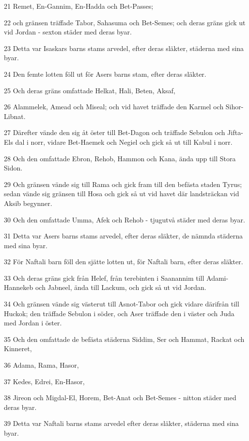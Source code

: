 \par 21 Remet, En-Gannim, En-Hadda och Bet-Passes;
\par 22 och gränsen träffade Tabor, Sahasuma och Bet-Semes; och deras gräns gick ut vid Jordan - sexton städer med deras byar.
\par 23 Detta var Isaskars barns stams arvedel, efter deras släkter, städerna med sina byar.
\par 24 Den femte lotten föll ut för Asers barns stam, efter deras släkter.
\par 25 Och deras gräns omfattade Helkat, Hali, Beten, Aksaf,
\par 26 Alammelek, Amead och Miseal; och vid havet träffade den Karmel och Sihor-Libnat.
\par 27 Därefter vände den sig åt öster till Bet-Dagon och träffade Sebulon och Jifta-Els dal i norr, vidare Bet-Haemek och Negiel och gick så ut till Kabul i norr.
\par 28 Och den omfattade Ebron, Rehob, Hammon och Kana, ända upp till Stora Sidon.
\par 29 Och gränsen vände sig till Rama och gick fram till den befästa staden Tyrus; sedan vände sig gränsen till Hosa och gick så ut vid havet där landsträckan vid Aksib begynner.
\par 30 Och den omfattade Umma, Afek och Rehob - tjugutvå städer med deras byar.
\par 31 Detta var Asers barns stams arvedel, efter deras släkter, de nämnda städerna med sina byar.
\par 32 För Naftali barn föll den sjätte lotten ut, för Naftali barn, efter deras släkter.
\par 33 Och deras gräns gick från Helef, från terebinten i Saanannim till Adami-Hannekeb och Jabneel, ända till Lackum, och gick så ut vid Jordan.
\par 34 Och gränsen vände sig västerut till Asnot-Tabor och gick vidare därifrån till Huckok; den träffade Sebulon i söder, och Aser träffade den i väster och Juda med Jordan i öster.
\par 35 Och den omfattade de befästa städerna Siddim, Ser och Hammat, Rackat och Kinneret,
\par 36 Adama, Rama, Hasor,
\par 37 Kedes, Edrei, En-Hasor,
\par 38 Jireon och Migdal-El, Horem, Bet-Anat och Bet-Semes - nitton städer med deras byar.
\par 39 Detta var Naftali barns stams arvedel efter deras släkter, städerna med sina byar.
